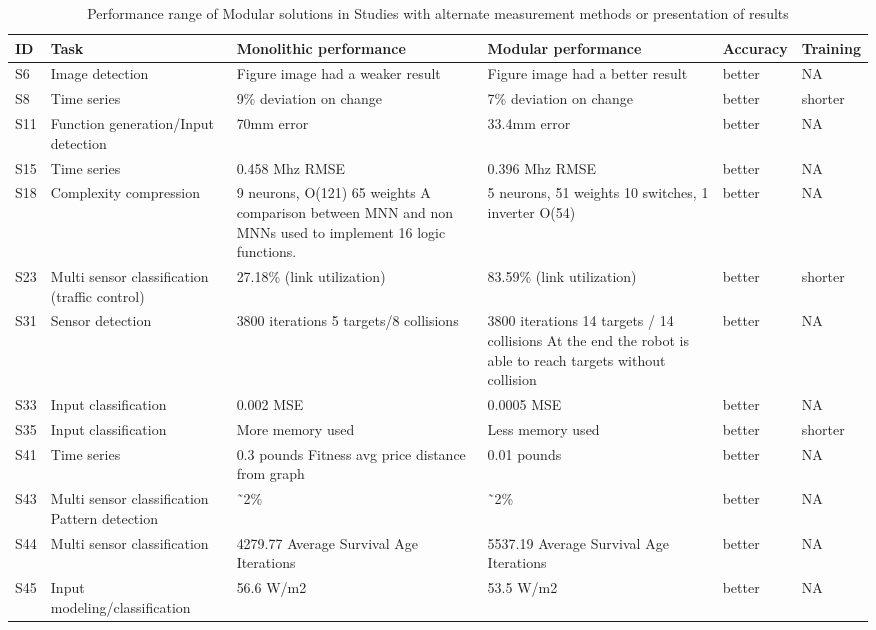 \documentclass{article}
\begin{document}
 
\begin{table*}[]
\caption{Performance range of Modular solutions in Studies with alternate measurement methods or presentation of results} \label{tab:accuracy2}
\begin{tabularx}{\textwidth}{p{.2cm} p{4.75cm}  X X p{1.5cm} p{1.5cm} }
\hline

ID & Task &  Monolithic performance &  Modular performance& Accuracy& Training \\ \hline


S6 	&	 Image detection 			&	 Figure image had a weaker result 	&	 Figure image had a better result 	&	better	&	 NA 	\\
S8 	&	 Time series 			&	 9\% deviation on change 	&	 7\% deviation on change 	&	better	&	 shorter 	\\
S11 	&	 Function generation/Input detection 			&	 70mm error 	&	 33.4mm error 	&	better	&	 NA 	\\
S15 	&	 Time series 			&	 0.458 Mhz RMSE 	&	 0.396 Mhz RMSE 	&	better	&	 NA 	\\
S18 	&	 Complexity compression 			&	 9 neurons, O(121) 65 weights A comparison between MNN and non MNNs used to implement 16 logic functions. 	&	 5 neurons, 51 weights 10 switches, 1 inverter O(54) 	&	better	&	 NA 	\\
S23 	&	 Multi sensor classification (traffic control) 			&	 27.18\% (link utilization) 	&	 83.59\% (link utilization) 	&	better	&	 shorter 	\\
S31 	&	 Sensor detection 			&	 3800 iterations 5 targets/8 collisions 	&	 3800 iterations 14 targets / 14 collisions At the end the robot is able to reach targets without collision 	&	better	&	 NA 	\\
S33 	&	 Input classification 			&	 0.002 MSE 	&	 0.0005 MSE 	&	better	&	 NA 	\\
S35 	&	 Input classification 			&	 More memory used 	&	 Less memory used 	&	better	&	 shorter 	\\
S41 	&	 Time series 			&	 0.3 pounds Fitness avg price distance from graph 	&	 0.01 pounds 	&	better	&	 NA 	\\
S43 	&	 Multi sensor classification Pattern detection 			&	 ˜2\% 	&	 ˜2\% 	&	better	&	 NA 	\\
S44 	&	 Multi sensor classification 			&	 4279.77 Average Survival Age Iterations 	&	 5537.19 Average Survival Age Iterations 	&	better	&	 NA 	\\
S45 	&	 Input modeling/classification 			&	 56.6 W/m2 	&	 53.5 W/m2 	&	better	&	 NA 	\\

\end{tabularx}
\end{table*}
\end{document}

